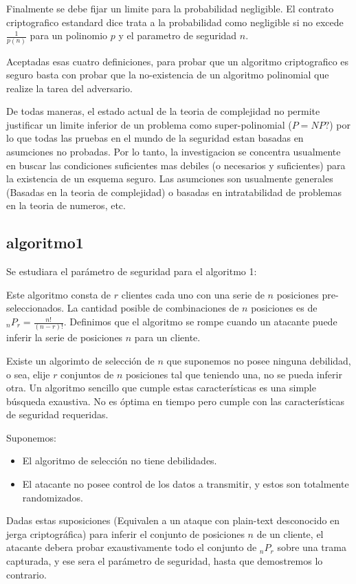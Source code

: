 \documentclass[a4paper,12pt]{article}
\begin{document}
Finalmente se debe fijar un limite para la probabilidad negligible. El contrato criptografico estandard dice trata a la probabilidad como negligible si no excede $\frac{1}{p(n)}$  para un polinomio $p$ y el parametro de seguridad $n$.

Aceptadas esas cuatro definiciones, para probar que un algoritmo criptografico es seguro basta con probar que la no-existencia de un algoritmo polinomial que realize la tarea del adversario.

De todas maneras, el estado actual de la teoria de complejidad no permite justificar un limite inferior de un problema como super-polinomial ($P=NP?$) por lo que todas las pruebas en el mundo de la seguridad estan basadas en asumciones no probadas.
Por lo tanto, la investigacion se concentra usualmente en buscar las condiciones suficientes mas debiles (o necesarios y suficientes) para la existencia de un esquema seguro.
Las asumciones son usualmente generales (Basadas en la teoria de complejidad) o basadas en intratabilidad de problemas en la teoria de numeros, etc.

\subsection{algoritmo1}

Se estudiara el parámetro de seguridad para el algoritmo 1:

Este algoritmo consta de $r$ clientes cada uno con una serie de $n$ posiciones pre-seleccionados.
La cantidad posible de combinaciones de $n$ posiciones es de $ _{n}P_{r} = \frac{n!}{(n-r)!} $.
Definimos que el algoritmo se rompe cuando un atacante puede inferir la serie de posiciones $n$ para un cliente.

Existe un algorimto de selección de $n$ que suponemos no posee ninguna debilidad, o sea, elije $r$ conjuntos de $n$ posiciones tal que teniendo una, no se pueda inferir otra.
Un algoritmo sencillo que cumple estas características es una simple búsqueda exaustiva. No es óptima en tiempo pero cumple con las características de seguridad requeridas.

Suponemos:
\begin{itemize}
 \item El algoritmo de selección no tiene debilidades.
 \item El atacante no posee control de los datos a transmitir, y estos son totalmente randomizados.
\end{itemize}

Dadas estas suposiciones (Equivalen a un ataque con plain-text desconocido en jerga criptográfica) para inferir el conjunto de posiciones $n$ de un cliente, el atacante debera probar exaustivamente todo el conjunto de $ _{n}P_{r}$ sobre una trama capturada, y ese sera el parámetro de seguridad, hasta que demostremos lo contrario.
\end{document}
